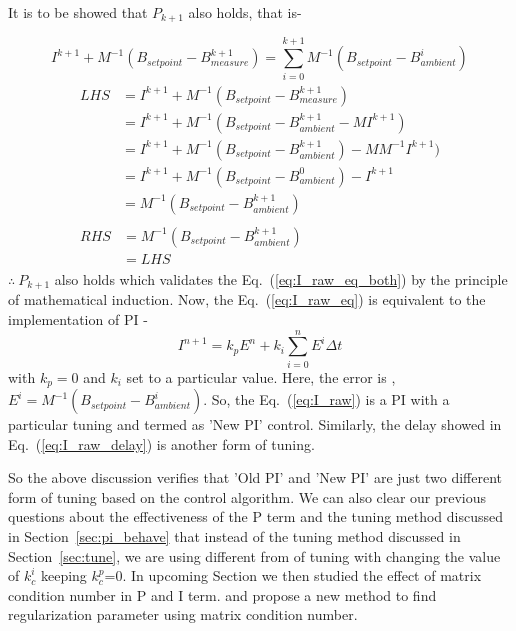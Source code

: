 It is to be showed that $P_{k+1}$ also holds, that is-

\begin{equation}\label{eq:I_raw_98}
   I^{k+1}+M^{-1} (B_{setpoint}-B_{measure}^{k+1})= \sum_{i=0}^{k+1} M^{-1} (B_{setpoint}-B_{ambient}^i)
\end{equation}
\begin{align*}
    \begin{split}
      LHS &=I^{k+1}+M^{-1} (B_{setpoint}-B_{measure}^{k+1}) \\
        &=I^{k+1}+M^{-1} (B_{setpoint}-B_{ambient}^{k+1} -M I^{k+1}) \\
        &=I^{k+1}+M^{-1} (B_{setpoint}-B_{ambient}^{k+1}) - MM^{-1} I^{k+1}) \\
        &=I^{k+1}+M^{-1} (B_{setpoint}-B_{ambient}^0) - I^{k+1} \\
        &=M^{-1} (B_{setpoint}-B_{ambient}^{k+1})
    \end{split}
    \\
    \begin{split}
      RHS &=M^{-1} (B_{setpoint}-B_{ambient}^{k+1})\\
          &= LHS
    \end{split}
\end{align*}
$\therefore \: P_{k+1}$ also holds which validates the Eq.~(\ref{eq:I_raw_eq_both}) by the principle of mathematical induction. \newline
Now, the Eq.~(\ref{eq:I_raw_eq}) is equivalent to the implementation of PI -
\begin{equation}\label{eq:I_raw_pi}
    I^{n+1}= k_p E^n+ k_i \sum_{i=0}^n E^i \Delta t
\end{equation}
with $k_p=0$ and $k_i$ set to a particular value. Here, the error is , $E^i=M^{-1} (B_{setpoint}-B_{ambient}^i)$. So, the Eq.~(\ref{eq:I_raw}) is a PI with a particular tuning and termed as 'New PI' control. Similarly, the delay showed in Eq.~(\ref{eq:I_raw_delay}) is another form of tuning.

So the above discussion verifies that 'Old PI' and 'New PI' are just two different form of tuning based on the control algorithm. We can also clear our previous questions about the effectiveness of the P term and the tuning method discussed in Section~\ref{sec:pi_behave} that instead of the tuning method discussed in Section~\ref{sec:tune}, we are using different from of tuning with changing the value of $k_c^i$ keeping $k_c^p$=0. In upcoming Section we then studied the effect of  matrix condition number in P and I term. and propose a new method to find regularization parameter using matrix condition number. 



